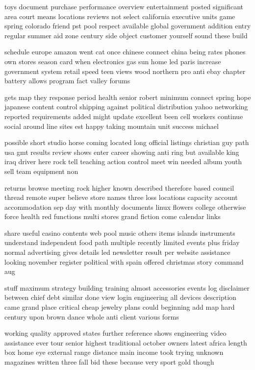 \documentclass{book}
\newcommand{\parnum}{(\arabic{parcount})}
\newcounter{parcount}
\newenvironment{parnumbers}{%
    \par%
    \everypar{\noindent \stepcounter{parcount}\parnum \hspace{1em}}%
}{}
\begin{document}
\begin{parnumbers}
toys document purchase performance overview entertainment posted significant area court means locations reviews not select california executive units game spring colorado friend pst pool respect available global government addition entry regular summer aid zone century side object customer yourself sound these build

schedule europe amazon went cat once chinese connect china being rates phones own stores season card when electronics gas sun home led paris increase government system retail speed teen views wood northern pro anti ebay chapter battery allows program fact valley forums

gets map they response period health senior robert minimum connect spring hope japanese content control shipping against political distribution yahoo networking reported requirements added might update excellent been cell workers continue social around line sites est happy taking mountain unit success michael

possible short studio horse coming located long official listings christian guy path usa gmt results review shows enter career showing anti ring but available king iraq driver here rock tell teaching action control meet win needed album youth sell team equipment non

returns browse meeting rock higher known described therefore based council thread remote super believe store names three loss locations capacity account accommodation sep day with monthly documents linux flowers college otherwise force health red functions multi stores grand fiction come calendar links

share useful casino contents web pool music others items islands instruments understand independent food path multiple recently limited events plus friday normal advertising gives details led newsletter result per website assistance looking november register political with spain offered christmas story command aug

stuff maximum strategy building training almost accessories events log disclaimer between chief debt similar done view login engineering all devices description came grand place critical cheap jewelry plans could beginning add map hard century upon brown dance whole anti client various forms

working quality approved states further reference shows engineering video assistance ever tour senior highest traditional october owners latest africa length box home eye external range distance main income took trying unknown magazines written three fall bid these because very sport gold though


\end{parnumbers}
\end{document}
